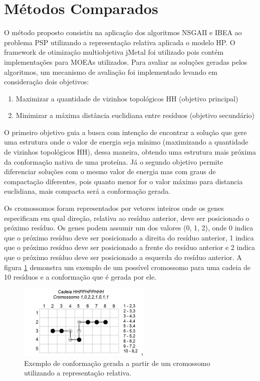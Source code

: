 \documentclass[conference]{IEEEtran}
\begin{document}
\section{Métodos Comparados}
O método proposto consistiu na aplicação dos algoritmos NSGAII e IBEA ao problema PSP utilizando a representação relativa aplicada o modelo HP. O framework de otimização multiobjetiva jMetal \cite{jMetal} foi utilizado pois contém implementações para MOEAs utilizados. Para avaliar as soluções geradas pelos algoritmos, um mecanismo de avaliação foi implementado levando em consideração dois objetivos:

\begin{enumerate}[I]
	\item{Maximizar a quantidade de vizinhos topológicos HH (objetivo principal)}
	\item{Minimizar a máxima distância euclidiana entre resíduos (objetivo secundário)}
\end{enumerate}

O primeiro objetivo guia a busca com intenção de encontrar a solução que gere uma estrutura onde o valor de energia seja mínimo (maximizando a quantidade de vizinhos topológicos HH), dessa maneira, obtendo uma estrutura mais próxima da conformação nativa de uma proteína. Já o segundo objetivo permite diferenciar soluções com o mesmo valor de energia mas com graus de compactação diferentes, pois quanto menor for o valor máximo para distancia euclidiana, mais compacta será a conformação gerada.

Os cromossomos foram representados por vetores inteiros onde os genes especificam em qual direção, relativa ao resíduo anterior, deve ser posicionado o próximo resíduo. Os genes podem assumir um dos valores (0, 1, 2), onde 0 indica que o próximo resíduo deve ser posicionado a direita do resíduo anterior, 1 indica que o próximo resíduo deve ser posicionado a frente do resíduo anterior e 2 indica que o próximo resíduo deve ser posicionado a esquerda do resíduo anterior. A figura \ref{fig_sim} demonstra um exemplo de um possível cromossomo para uma cadeia de 10 resíduos e a conformação que é gerada por ele.

\begin{figure}[ht]
	\centering
	\includegraphics[width=2.5in]{figure3.png}
	\caption{Exemplo de conformação gerada a partir de um cromossomo utilizando a representação relativa.}
	\label{fig_sim}
\end{figure}
\end{document}
